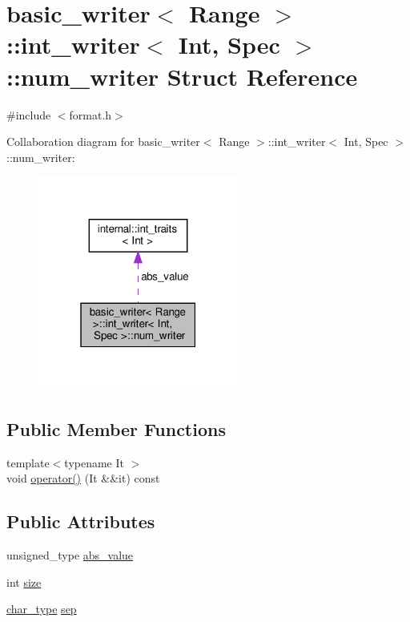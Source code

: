 \hypertarget{structbasic__writer_1_1int__writer_1_1num__writer}{}\section{basic\+\_\+writer$<$ Range $>$\+:\+:int\+\_\+writer$<$ Int, Spec $>$\+:\+:num\+\_\+writer Struct Reference}
\label{structbasic__writer_1_1int__writer_1_1num__writer}


{\ttfamily \#include $<$format.\+h$>$}



Collaboration diagram for basic\+\_\+writer$<$ Range $>$\+:\+:int\+\_\+writer$<$ Int, Spec $>$\+:\+:num\+\_\+writer\+:
\nopagebreak
\begin{figure}[H]
\begin{center}
\leavevmode
\includegraphics[width=187pt]{structbasic__writer_1_1int__writer_1_1num__writer__coll__graph}
\end{center}
\end{figure}
\subsection*{Public Member Functions}
\begin{DoxyCompactItemize}
\item 
{\footnotesize template$<$typename It $>$ }\\void \hyperlink{structbasic__writer_1_1int__writer_1_1num__writer_ac7c7665860b61c4d74911ec04ab2289e}{operator()} (It \&\&it) const
\end{DoxyCompactItemize}
\subsection*{Public Attributes}
\begin{DoxyCompactItemize}
\item 
unsigned\+\_\+type \hyperlink{structbasic__writer_1_1int__writer_1_1num__writer_a0835673552f2524ceb0abae40a1d1e77}{abs\+\_\+value}
\item 
int \hyperlink{structbasic__writer_1_1int__writer_1_1num__writer_aa76d9a3fe79b0f7e9466e1d19dedbb55}{size}
\item 
\hyperlink{classbasic__writer_ad6f1b4f79aa917bb28c4f4a37fabf0b7}{char\+\_\+type} \hyperlink{structbasic__writer_1_1int__writer_1_1num__writer_ab0d3768c7a36ac16af5c05b623287cc9}{sep}
\end{DoxyCompactItemize}


